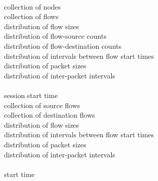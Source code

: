 \textbf{}\\
\hspace*{1ex}\raisebox{1.5pt}{$\centerdot$}~collection of nodes\\
\hspace*{1ex}\raisebox{1.5pt}{$\centerdot$}~collection of flows\\
\hspace*{1ex}\raisebox{1.5pt}{$\centerdot$}~distribution of flow sizes\\
\hspace*{1ex}\raisebox{1.5pt}{$\centerdot$}~distribution of flow-source counts\\
\hspace*{1ex}\raisebox{1.5pt}{$\centerdot$}~distribution of flow-destination counts\\
\hspace*{1ex}\raisebox{1.5pt}{$\centerdot$}~distribution of intervals between flow start times\\
\hspace*{1ex}\raisebox{1.5pt}{$\centerdot$}~distribution of packet sizes\\
\hspace*{1ex}\raisebox{1.5pt}{$\centerdot$}~distribution of inter-packet intervals\\
\textbf{}\\
\hspace*{1ex}\raisebox{1.5pt}{$\centerdot$}~session start time\\
\hspace*{1ex}\raisebox{1.5pt}{$\centerdot$}~collection of source flows\\
\hspace*{1ex}\raisebox{1.5pt}{$\centerdot$}~collection of destination flows\\
\hspace*{1ex}\raisebox{1.5pt}{$\centerdot$}~distribution of flow sizes\\
\hspace*{1ex}\raisebox{1.5pt}{$\centerdot$}~distribution of intervals between flow start times\\
\hspace*{1ex}\raisebox{1.5pt}{$\centerdot$}~distribution of packet sizes\\
\hspace*{1ex}\raisebox{1.5pt}{$\centerdot$}~distribution of inter-packet intervals\\
\textbf{}\\
\hspace*{1ex}\raisebox{1.5pt}{$\centerdot$}~start time\\
